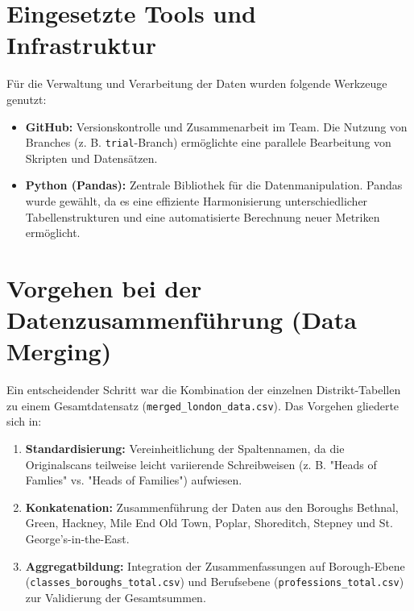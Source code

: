 \section*{Eingesetzte Tools und Infrastruktur}
Für die Verwaltung und Verarbeitung der Daten wurden folgende Werkzeuge genutzt:
\begin{itemize}
    \item \textbf{GitHub:} Versionskontrolle und Zusammenarbeit im Team. Die Nutzung von Branches (z. B. \texttt{trial}-Branch) ermöglichte eine parallele Bearbeitung von Skripten und Datensätzen.
    \item \textbf{Python (Pandas):} Zentrale Bibliothek für die Datenmanipulation. Pandas wurde gewählt, da es eine effiziente Harmonisierung unterschiedlicher Tabellenstrukturen und eine automatisierte Berechnung neuer Metriken ermöglicht.
\end{itemize}

\section*{Vorgehen bei der Datenzusammenführung (Data Merging)}
Ein entscheidender Schritt war die Kombination der einzelnen Distrikt-Tabellen zu einem Gesamtdatensatz (\texttt{merged\_london\_data.csv}). Das Vorgehen gliederte sich in:
\begin{enumerate}
    \item \textbf{Standardisierung:} Vereinheitlichung der Spaltennamen, da die Originalscans teilweise leicht variierende Schreibweisen (z. B. "Heads of Famlies" vs. "Heads of Families") aufwiesen.
    \item \textbf{Konkatenation:} Zusammenführung der Daten aus den Boroughs Bethnal, Green, Hackney, Mile End Old Town, Poplar, Shoreditch, Stepney und St. George's-in-the-East.
    \item \textbf{Aggregatbildung:} Integration der Zusammenfassungen auf Borough-Ebene (\texttt{classes\_boroughs\_total.csv}) und Berufsebene (\texttt{professions\_total.csv}) zur Validierung der Gesamtsummen.
\end{enumerate}
